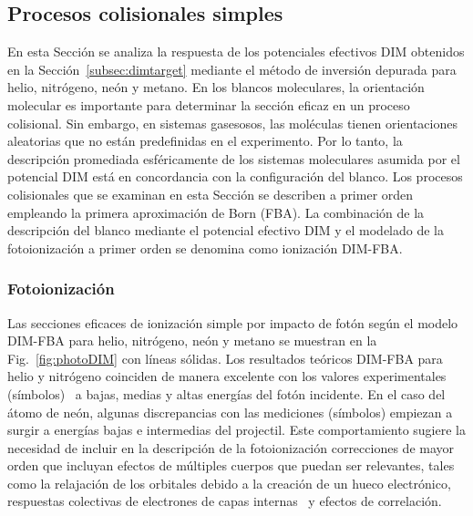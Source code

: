 {{{{%
\subsection{Procesos colisionales simples}
\label{subsec:procol}

En esta Sección se analiza la respuesta de los potenciales efectivos 
DIM obtenidos en la Sección~\ref{subsec:dimtarget} mediante el método 
de inversión depurada para helio, nitrógeno, neón y metano.
En los blancos moleculares, la orientación molecular es importante para 
determinar la sección eficaz en un proceso colisional. Sin embargo, en 
sistemas gasesosos, las moléculas tienen orientaciones aleatorias que no 
están predefinidas en el experimento. Por lo tanto, la descripción 
promediada esféricamente de los sistemas moleculares asumida por el 
potencial DIM está en concordancia con la configuración del blanco.
Los procesos colisionales que se examinan en esta Sección se describen a 
primer orden empleando la primera aproximación de Born (FBA). 
La combinación de la descripción del blanco mediante el potencial 
efectivo DIM y el modelado de la fotoionización a primer orden se 
denomina como ionización DIM-FBA. 

\subsubsection{Fotoionización}
\label{subsec:foto}

Las secciones eficaces de ionización simple por impacto de fotón según 
el modelo DIM-FBA para helio, nitrógeno, neón y metano se muestran en 
la Fig.~\ref{fig:photoDIM} con líneas sólidas. Los resultados teóricos 
DIM-FBA para helio y nitrógeno coinciden de manera excelente con los 
valores experimentales (símbolos)~\cite{Samson:90,Henke:93,Stolte:16} a 
bajas, medias y altas energías del fotón incidente. En el caso del átomo 
de neón, algunas discrepancias con las mediciones (símbolos) 
\cite{Henke:93,Samson:02} empiezan a surgir a energías bajas e 
intermedias del projectil. Este comportamiento sugiere la necesidad de 
incluir en la descripción de la fotoionización correcciones de mayor 
orden que incluyan efectos de múltiples cuerpos que puedan ser 
relevantes, tales como la relajación de los orbitales debido a la 
creación de un hueco electrónico, respuestas colectivas de electrones 
de capas internas~\cite{Ederer:64} y efectos de correlación.

}}}}

